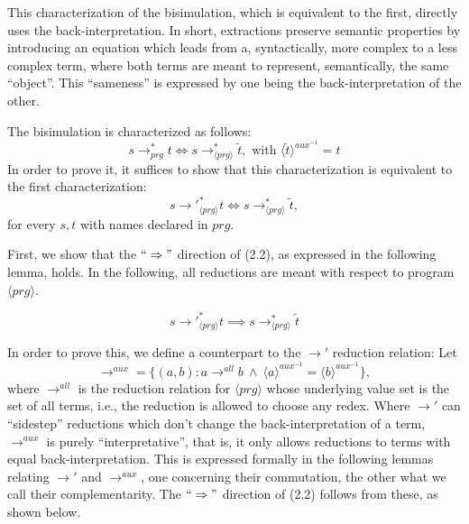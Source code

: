 This characterization of the bisimulation, which is equivalent to the first, directly uses the back-interpretation. In short, extractions preserve semantic properties by introducing an equation which leads from a, syntactically, more complex to a less complex term, where both terms are meant to represent, semantically, the same ``object''. This ``sameness'' is expressed by one being the back-interpretation of the other.

The bisimulation is characterized as follows:
\[
s {\longrightarrow}_{prg}^* t \iff s \longrightarrow^*_{\langle prg \rangle} \widetilde{t}, \text{ with } \langle \widetilde{t} \rangle^{aux^{-1}} = t
\]
In order to prove it, it suffices to show that this characterization is equivalent to the first characterization:
\begin{equation}
s {\longrightarrow'}_{\langle prg \rangle}^* t \iff s \longrightarrow^*_{\langle prg \rangle} \widetilde{t},
\end{equation}
for every $s, t$ with names declared in $prg$.

First, we show that the $`` \Rightarrow "$ direction of (2.2), as expressed in the following lemma, holds. In the following, all reductions are meant with respect to program $\langle prg \rangle$.

\begin{lemma}
\label{lem:prop2lr}
\[
s {\longrightarrow'}_{\langle prg \rangle}^* t \implies s \longrightarrow^*_{\langle prg \rangle} \widetilde{t}
\]
\end{lemma}

In order to prove this, we define a counterpart to the $\longrightarrow'$ reduction relation: Let
\[
\longrightarrow^{aux} = \{(a,b) : a \longrightarrow^{all} b ~ \land ~ \langle a \rangle^{aux^{-1}} = \langle b \rangle^{aux^{-1}}\},
\]
where $\longrightarrow^{all}$ is the reduction relation for $\langle prg \rangle$ whose underlying value set is the set of all terms, i.e., the reduction is allowed to choose any redex. Where $\longrightarrow'$ can ``sidestep'' reductions which don't change the back-interpretation of a term, $\longrightarrow^{aux}$ is purely ``interpretative'', that is, it only allows reductions to terms with equal back-interpretation. This is expressed formally in the following lemmas relating $\longrightarrow'$ and $\longrightarrow^{aux}$, one concerning their commutation, the other what we call their complementarity. The $`` \Rightarrow "$ direction of (2.2) follows from these, as shown below.

